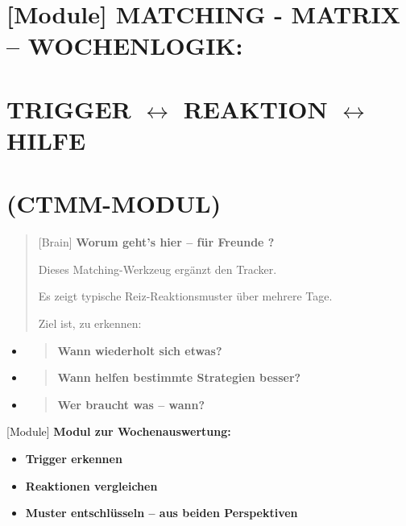 \hypertarget{matching---matrix-wochenlogik}{%
\section{\texorpdfstring{[Module] \textbf{MATCHING - MATRIX -- WOCHENLOGIK:}}{[Module] MATCHING - MATRIX -- WOCHENLOGIK:}}\label{matching---matrix-wochenlogik}}

\hypertarget{trigger-reaktion-hilfe}{%
\section{\texorpdfstring{\textbf{TRIGGER $\leftrightarrow$ REAKTION $\leftrightarrow$ HILFE}}{TRIGGER $\leftrightarrow$ REAKTION $\leftrightarrow$ HILFE}}\label{trigger-reaktion-hilfe}}

\hypertarget{ctmm-modul}{%
\section{\texorpdfstring{\textbf{(CTMM-MODUL)}}{(CTMM-MODUL)}}\label{ctmm-modul}}

\begin{quote}
[Brain] \textbf{Worum geht's hier -- für Freunde ?}

Dieses Matching-Werkzeug ergänzt den Tracker.

Es zeigt typische Reiz-Reaktionsmuster über mehrere Tage.

Ziel ist, zu erkennen:
\end{quote}

\begin{itemize}
\item
  \begin{quote}
  \textbf{Wann wiederholt sich etwas?}
  \end{quote}
\item
  \begin{quote}
  \textbf{Wann helfen bestimmte Strategien besser?}
  \end{quote}
\item
  \begin{quote}
  \textbf{Wer braucht was -- wann?}
  \end{quote}
\end{itemize}

[Module] \textbf{Modul zur Wochenauswertung:}

\begin{itemize}
\item
  \textbf{Trigger erkennen}
\item
  \textbf{Reaktionen vergleichen}
\item
  \textbf{Muster entschlüsseln -- aus beiden Perspektiven}
\end{itemize}

